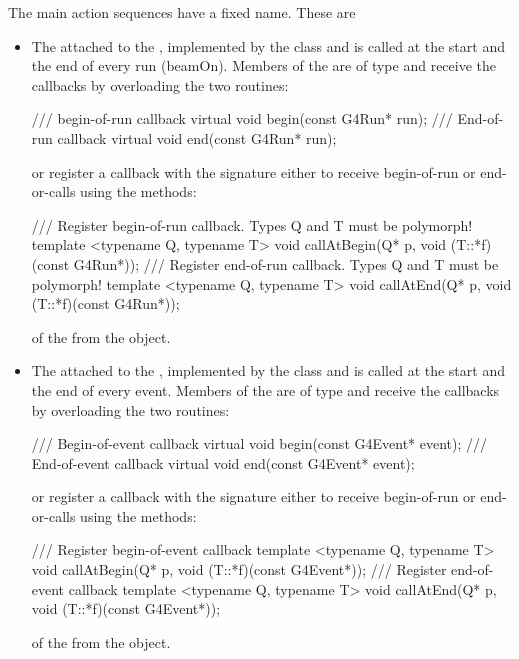 \documentclass[10pt,a4paper]{article}
\begin{document}
\noindent
The main action sequences have a fixed name. These are
\begin{itemize}

\item The  attached to the , implemented 
    by the  class and is called at the start and the end of 
    every run (beamOn). Members of the  are of type
     and receive the callbacks by overloading the two routines:
\begin{unnumberedcode}
/// begin-of-run callback
virtual void begin(const G4Run* run);
/// End-of-run callback
virtual void end(const G4Run* run);
\end{unnumberedcode}
    or register a callback with the signature {}
    either to receive begin-of-run or end-or-calls using the methods:
\begin{unnumberedcode}
/// Register begin-of-run callback. Types Q and T must be polymorph!
template <typename Q, typename T> void callAtBegin(Q* p, void (T::*f)(const G4Run*));
/// Register end-of-run callback. Types Q and T must be polymorph!
template <typename Q, typename T> void callAtEnd(Q* p, void (T::*f)(const G4Run*));
\end{unnumberedcode}
    of the  from the  object.


\item The  attached to the , implemented 
    by the  class and is called at the start and the end of 
    every event. Members of the  are of type
     and receive the callbacks by overloading the two routines:
\begin{unnumberedcode}
/// Begin-of-event callback
virtual void begin(const G4Event* event);
/// End-of-event callback
virtual void end(const G4Event* event);
\end{unnumberedcode}
    or register a callback with the signature {}
    either to receive begin-of-run or end-or-calls using the methods:
\begin{unnumberedcode}
/// Register begin-of-event callback
template <typename Q, typename T> void callAtBegin(Q* p, void (T::*f)(const G4Event*));
/// Register end-of-event callback
template <typename Q, typename T> void callAtEnd(Q* p, void (T::*f)(const G4Event*));
\end{unnumberedcode}
    of the  from the  object.



\end{itemize}
\end{document}
